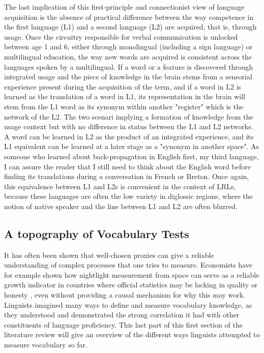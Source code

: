 The last implication of this first-principle and connectionist view of language acquisition is the absence of practical difference between the way competence in the first language (L1) and a second language (L2) are acquired, that is, through usage. Once the circuitry responsible for verbal communication is unlocked between age 1 and 6, either through monolingual (including a sign language) or multilingual education, the way new words are acquired is consistent across the languages spoken by a multilingual. If a word or a feature is discovered through integrated usage and the piece of knowledge in the brain stems from a sensorial experience present during the acquisition of the term, and if a word in L2 is learned as the translation of a word in L1, its representation in the brain will stem from the L1 word as its synonym within another "register" which is the network of the L2. The two scenari implying a formation of knowledge from the usage context but with no difference in status between the L1 and L2 networks. A word can be learned in L2 as the product of an integrated experience, and its L1 equivalent can be learned at a later stage as a "synonym in another space". As someone who learned about back-propagation in English first, my third language, I can assure the reader that I still need to think about the English word before finding its translations during a conversation in French or Breton. Once again, this equivalence between L1 and L2s is convenient in the context of LRLs, because these languages are often the low variety in diglossic regions, where the notion of native speaker and the line between L1 and L2 are often blurred.

    \subsection{A topography of Vocabulary Tests}
It has often been shown that well-chosen proxies can give a reliable understanding of complex processes that one tries to measure. Economists have for example shown how nightlight measurement from space can serve as a reliable growth indicator in countries where official statistics may be lacking in quality or honesty \parencite{henderson_measuring_2009}, even without providing a causal mechanism for why this may work. Linguists imagined many ways to define and measure vocabulary knowledge, as they understood and demonstrated the strong correlation it had with other constituents of language proficiency. This last part of this first section of the literature review will give an overview of the different ways linguists attempted to measure vocabulary so far.


